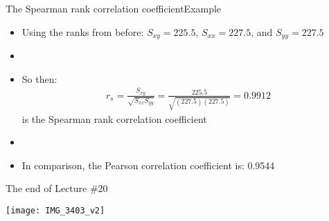 \documentclass[xcolor=dvipsnames]{beamer}
\begin{document}
\begin{frame}{The Spearman rank correlation coefficient}{Example}
	\begin{itemize}
		\item Using the ranks from before: $S_{xy} = 225.5$, $S_{xx}=227.5$, and $S_{yy}=227.5$
		\item[]
		\item So then:
		\begin{gather*}
			r_{s}=\frac{S_{xy}}{\sqrt{S_{xx}S_{yy}}} = \frac{225.5}{\sqrt{(227.5)(227.5)}} = 0.9912
		\end{gather*}
		is the Spearman rank correlation coefficient
		\item[]
		\item In comparison, the Pearson correlation coefficient is: 0.9544
	\end{itemize}
\end{frame}

\begin{frame}{The end of Lecture \#20}
	\begin{center}
		\texttt{[image: IMG\_3403\_v2]}
	\end{center}
\end{frame}
\end{document}
